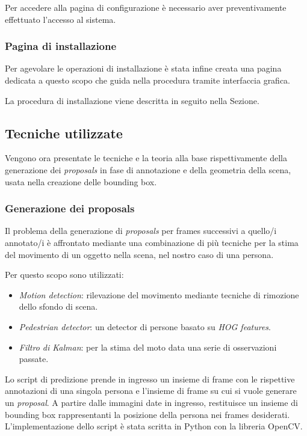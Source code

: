 Per accedere alla pagina di configurazione è necessario aver preventivamente effettuato l'accesso al sistema.

\subsubsection{Pagina di installazione}

Per agevolare le operazioni di installazione è stata infine creata una pagina dedicata a questo scopo che guida nella procedura tramite interfaccia grafica. 

La procedura di installazione viene descritta in seguito nella Sezione.

\subsection{Tecniche utilizzate}

Vengono ora presentate le tecniche e la teoria alla base rispettivamente della generazione dei \emph{proposals} in fase di annotazione e della geometria della scena, usata nella creazione delle bounding box.

\subsubsection{Generazione dei proposals}

Il problema della generazione di \emph{proposals} per frames successivi a quello/i annotato/i è affrontato mediante una combinazione di più tecniche per la stima del movimento di un oggetto nella scena, nel nostro caso di una persona.

Per questo scopo sono utilizzati:
\begin{itemize}
\item \emph{Motion detection}: rilevazione del movimento mediante tecniche di rimozione dello sfondo di scena.
\item \emph{Pedestrian detector}: un detector di persone basato su \emph{HOG features}.
\item \emph{Filtro di Kalman}: per la stima del moto data una serie di osservazioni passate.
\end{itemize}

Lo script di predizione prende in ingresso un insieme di frame con le rispettive annotazioni di una singola persona e l'insieme di frame su cui si vuole generare un \emph{proposal}. A partire dalle immagini date in ingresso, restituisce un insieme di bounding box rappresentanti la posizione della persona nei frames desiderati. L'implementazione dello script è stata scritta in Python con la libreria OpenCV.

